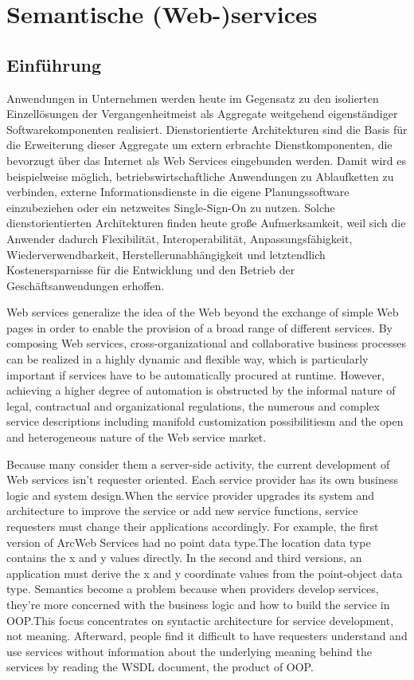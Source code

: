 \documentclass[10pt,a4paper]{article}
\begin{document}
\section{Semantische (Web-)services}
\label{l:sem-web-ser}
\subsection{Einführung}

Anwendungen in Unternehmen werden heute im Gegensatz zu den isolierten Einzellösungen
der Vergangenheitmeist als Aggregate weitgehend eigenständiger Softwarekomponenten realisiert.
Dienstorientierte Architekturen sind die Basis für die Erweiterung dieser Aggregate um
extern erbrachte Dienstkomponenten, die bevorzugt über das Internet als Web Services eingebunden
werden. Damit wird es beispielweise möglich, betriebswirtschaftliche Anwendungen zu
Ablaufketten zu verbinden, externe Informationsdienste in die eigene Planungssoftware einzubeziehen
oder ein netzweites Single-Sign-On zu nutzen. Solche dienstorientierten Architekturen
finden heute große Aufmerksamkeit, weil sich die Anwender dadurch Flexibilität, Interoperabilität,
Anpassungsfähigkeit, Wiederverwendbarkeit, Herstellerunabhängigkeit und letztendlich
Kostenersparnisse für die Entwicklung und den Betrieb der Geschäftsanwendungen erhoffen. \cite{addo}

Web services generalize the idea of the Web beyond the exchange of simple Web pages in order to enable the provision of a broad range of different services. By composing Web services, cross-organizational and collaborative business processes can be realized in a highly dynamic and flexible way, which is particularly important if services have to be automatically procured at runtime. However, achieving a higher degree of automation is obstructed by the informal nature of legal, contractual and organizational regulations, the numerous and complex service descriptions including manifold customization possibilitiesm and the open and heterogeneous nature of the Web service market.

Because many consider them a server-side activity, the
current development of Web services isn’t requester oriented.
Each service provider has its own business logic and
system design.When the service provider upgrades its system
and architecture to improve the service or add new
service functions, service requesters must change their
applications accordingly. For example, the first version of
ArcWeb Services had no point data type.The location data
type contains the x and y values directly. In the second and
third versions, an application must derive the x and y coordinate
values from the point-object data type. Semantics
become a problem because when providers develop services,
they’re more concerned with the business logic and
how to build the service in OOP.This focus concentrates
on syntactic architecture for service development, not
meaning. Afterward, people find it difficult to have
requesters understand and use services without information
about the underlying meaning behind the services by
reading the WSDL document, the product of OOP. \cite{shi1}
\end{document}

